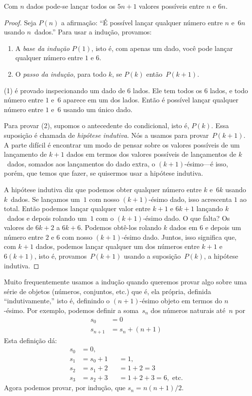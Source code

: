\documentclass[../../../include/open-logic-section]{subfiles}
\begin{document}
\begin{thm}
  Com $n$ dados pode-se lançar todos os $5n+1$ valores possíveis entre $n$
  e $6n$.
\end{thm}

\begin{proof}
Seja $P(n)$ a afirmação: ``É possível lançar qualquer número entre
$n$ e~$6n$ usando $n$~dados.''  Para usar a indução, provamos:
\begin{enumerate}
\item A \emph{base da indução} $P(1)$, isto é, com apenas um dado,
  você pode lançar qualquer número entre $1$ e $6$.
\item O \emph{passo da indução}, para todo $k$, se $P(k)$ então~$P(k+1)$.
\end{enumerate}

(1) é provado inspecionando um dado de $6$ lados. Ele tem todos os 6 lados, e
todo número entre $1$ e~$6$ aparece em um dos lados. Então é
possível lançar qualquer número entre $1$ e~$6$ usando um único
dado.

Para provar (2), supomos o antecedente do condicional, isto é,
$P(k)$. Essa suposição é chamada de \emph{hipótese indutiva}.  Nós a
usamos para provar~$P(k+1)$. A parte difícil é encontrar um modo de pensar
sobre os valores possíveis de um lançamento de $k+1$ dados em termos dos
valores possíveis de lançamentos de $k$~dados, somados aos lançamentos do dado
extra, o $(k+1)$-ésimo---é isso, porém, que temos que fazer, se quisermos usar
a hipótese indutiva.

A hipótese indutiva diz que podemos obter qualquer número entre $k$
e~$6k$ usando $k$~dados.  Se lançamos um~$1$ com nosso $(k+1)$-ésimo dado,
isso acrescenta $1$ ao total. Então podemos lançar qualquer valor entre $k+1$
e $6k+1$ lançando $k$~dados e depois rolando um~$1$ com o
$(k+1)$-ésimo dado.  O que falta?  Os valores de $6k+2$ a $6k+6$.  Podemos
obtê-los rolando $k$ dados em $6$ e depois um número entre $2$ e
$6$ com nosso $(k+1)$-ésimo dado. Juntos, isso significa que, com $k+1$ dados,
podemos lançar qualquer um dos números entre $k+1$ e $6(k+1)$, isto é,
provamos~$P(k+1)$ usando a suposição~$P(k)$, a hipótese
indutiva.
\end{proof}

Muito frequentemente usamos a indução quando queremos provar algo sobre uma
série de objetos (números, conjuntos, etc.) que é, ela própria, definida
``indutivamente,'' isto é, definindo o $(n+1)$-ésimo objeto em termos do
$n$-ésimo.  Por exemplo, podemos definir a soma~$s_n$ dos números naturais
até~$n$ por
\begin{align*}
  s_0 & = 0\\
  s_{n+1} & = s_n + (n+1)
\end{align*}
Esta definição dá:
\begin{align*}
  s_0 & = 0,\\
  s_1 & = s_0 + 1 && = 1,\\
  s_2 & = s_1 + 2 && = 1 + 2 = 3\\
  s_3 & = s_2 + 3 && = 1 + 2 + 3 = 6, \text{ etc.}
\end{align*}
Agora podemos provar, por indução, que $s_n = n(n+1)/2$.
\end{document}
